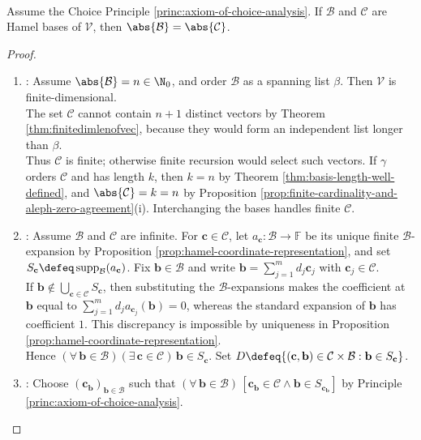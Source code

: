 \begin{theorem} \label{thm:arbitrary-bases-same-cardinality} \\
Assume the Choice Principle \ref{princ:axiom-of-choice-analysis}. If $\mathcal{B}$ and $\mathcal{C}$ are Hamel bases of $\mathcal{V}$, then $\abs{\mathcal{B}}=\abs{\mathcal{C}}$.
\begin{proof}
\begin{enumerate}[label=(\roman*)]
\setlength{\itemsep}{0pt}
\item {}: Assume $\abs{\mathcal{B}}=n\in\N_0$, and order $\mathcal{B}$ as a spanning list $\beta$. Then $\mathcal{V}$ is finite-dimensional.\\
The set $\mathcal{C}$ cannot contain $n+1$ distinct vectors by Theorem \ref{thm:finitedimlenofvec}, because they would form an independent list longer than $\beta$.\\
Thus $\mathcal{C}$ is finite; otherwise finite recursion would select such vectors. If $\gamma$ orders $\mathcal{C}$ and has length $k$, then $k=n$ by Theorem \ref{thm:basis-length-well-defined}, and $\abs{\mathcal{C}}=k=n$ by Proposition \ref{prop:finite-cardinality-and-aleph-zero-agreement}(i). Interchanging the bases handles finite $\mathcal{C}$.
\item {}: Assume $\mathcal{B}$ and $\mathcal{C}$ are infinite. For $\mathbf{c}\in\mathcal{C}$, let $a_{\mathbf{c}}:\mathcal{B}\to\mathbb{F}$ be its unique finite $\mathcal{B}$-expansion by Proposition \ref{prop:hamel-coordinate-representation}, and set $S_{\mathbf{c}}\defeq\operatorname{supp}_{\mathcal{B}}(a_{\mathbf{c}})$. Fix $\mathbf{b}\in\mathcal{B}$ and write $\mathbf{b}=\sum\limits_{j=1}^{m}d_j\mathbf{c}_j$ with $\mathbf{c}_j\in\mathcal{C}$.\\
If $\mathbf{b}\notin\bigcup\limits_{\mathbf{c}\in\mathcal{C}}S_{\mathbf{c}}$, then substituting the $\mathcal{B}$-expansions makes the coefficient at $\mathbf{b}$ equal to $\sum\limits_{j=1}^{m}d_j a_{\mathbf{c}_j}(\mathbf{b})=0$, whereas the standard expansion of $\mathbf{b}$ has coefficient $1$. This discrepancy is impossible by uniqueness in Proposition \ref{prop:hamel-coordinate-representation}.\\
Hence $(\forall\,\mathbf{b}\in\mathcal{B})(\exists\,\mathbf{c}\in\mathcal{C})\,\mathbf{b}\in S_{\mathbf{c}}$. Set $D\defeq\{(\mathbf{c},\mathbf{b})\in\mathcal{C}\times\mathcal{B}:\mathbf{b}\in S_{\mathbf{c}}\}$.
\item {}: Choose $(\mathbf{c}_{\mathbf{b}})_{\mathbf{b}\in\mathcal{B}}$ such that $(\forall\,\mathbf{b}\in\mathcal{B})\,[\mathbf{c}_{\mathbf{b}}\in\mathcal{C}\land\mathbf{b}\in S_{\mathbf{c}_{\mathbf{b}}}]$ by Principle \ref{princ:axiom-of-choice-analysis}.\\

\end{enumerate}
\end{proof}
\end{theorem}
